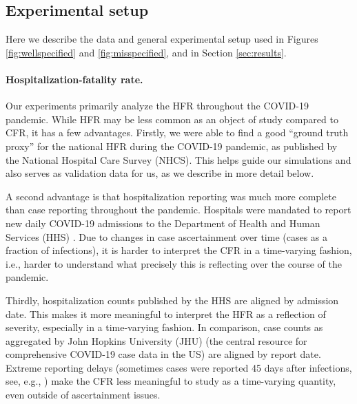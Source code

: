 \documentclass{article}
\begin{document}
\subsection{Experimental setup}
\label{sec:setup}

Here we describe the data and general experimental setup used in Figures
\ref{fig:wellspecified} and \ref{fig:misspecified}, and in Section
\ref{sec:results}.    

\paragraph{Hospitalization-fatality rate.}

Our experiments primarily analyze the HFR throughout the COVID-19 pandemic. While HFR 
may be less common as an object of study compared to CFR, it has a few
advantages. 
Firstly, we were able to find a good ``ground truth proxy'' for the national HFR 
during the COVID-19 pandemic, as published by the National Hospital Care Survey
(NHCS). This helps guide our simulations and also serves as validation data for
us, as we describe in more detail below. 

A second advantage is that hospitalization reporting was much more complete
than case reporting throughout the pandemic. Hospitals were mandated to report
new daily COVID-19 admissions to the Department of Health and Human Services
(HHS) \citep{HHS2023}. Due to changes in case ascertainment over time (cases as
a fraction of infections), it is harder to interpret the CFR in a time-varying
fashion, i.e., harder to understand what precisely this is reflecting over the
course of the pandemic.  

Thirdly, hospitalization counts published by the HHS are
aligned by admission date. This makes it more meaningful to interpret the HFR as
a reflection of severity, especially in a time-varying fashion. In comparison,
case counts as aggregated by John Hopkins University (JHU) \citep{JHU} (the
central resource for comprehensive COVID-19 case data in the US) are aligned by
report date. Extreme reporting delays (sometimes cases were reported 45 days
after infections, see, e.g., \citealp{Jahja2022}) make the CFR less meaningful
to study as a time-varying quantity, even outside of ascertainment issues.  

\end{document}
